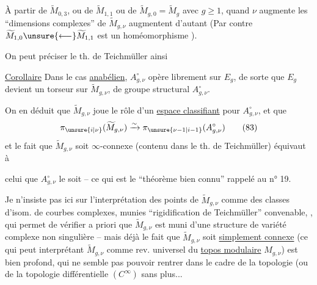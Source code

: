 À partir de \(\widetilde M_{0,3}\), ou de \(\widetilde M_{1,1}\) ou de \(\widetilde M_{g,0}=\widetilde M_g\) avec \(g\geq 1\), quand \(\nu\) augmente les ``dimensions complexes'' de \(\widetilde M_{g,\nu}\) augmentent d'autant (Par contre \(\widetilde M_{1,0}\unsure{\longleftarrow}\widetilde M_{1,1}\) est un homéomorphisme ).

On peut préciser le th. de Teichmüller ainsi

\uline{Corollaire} Dans le cas \uline{anabélien}, \(A_{g,\nu}^{\circ}\) opère librement sur \(E_g\), de sorte que \(E_g\) devient un torseur sur \(\widetilde M_{g,\nu}\), de groupe structural \(A_{g,\nu}^{\circ}\).

On en déduit que \(\widetilde M_{g,\nu}\) joue le rôle d'un \uline{espace classifiant} pour \(A_{g,\nu}^{\circ}\), et que
\[
 \pi_{\unsure{i|\nu}}(\widetilde M_{g,\nu})
 \xrightarrow{\sim} \pi_{\unsure{\nu-1|i-1}}(A_{g,\nu}^{\circ})
 \tag{83}
\]
et le fait que \(\widetilde M_{g,\nu}\) soit \(\infty\)-connexe (contenu dans le th. de Teichmüller) équivaut à


celui que \(A_{g,\nu}^{\circ}\) le soit -- ce qui est le ``théorème bien connu'' rappelé au n° 19.

Je n'insiste pas ici sur l'interprétation des points de \(\widetilde M_{g,\nu}\) comme des classes d'isom. de courbes complexes, munies   ``rigidification de Teichmüller'' convenable, , qui permet de vérifier a priori que \(\widetilde M_{g,\nu}\) est muni d'une structure de variété complexe non singulière -- mais déjà le fait que \(\widetilde M_{g,\nu}\) soit \uline{simplement connexe} (ce qui peut   interprétant \(\widetilde M_{g,\nu}\) comme rev. universel du \uline{topos modulaire} \(M_{g,\nu}\)) est bien profond, qui ne semble pas pouvoir rentrer dans le cadre de la topologie (ou de la topologie différentielle \((C^\infty)\) sans plus...


